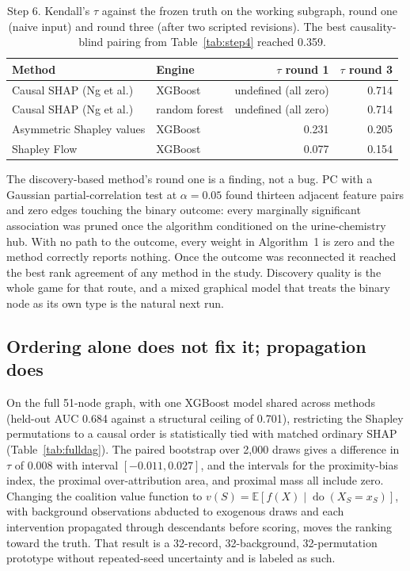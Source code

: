 \documentclass[11pt]{article}
\newcommand{\dox}{\operatorname{do}}
\begin{document}
\begin{table}[htbp]
\centering
\caption{Step 6. Kendall's $\tau$ against the frozen truth on the working
subgraph, round one (naive input) and round three (after two scripted
revisions). The best causality-blind pairing from Table~\ref{tab:step4}
reached 0.359.}
\label{tab:step6}
\begin{tabular}{llrr}
\toprule
Method & Engine & $\tau$ round 1 & $\tau$ round 3\\
\midrule
Causal SHAP (Ng et al.) & XGBoost & undefined (all zero) & 0.714\\
Causal SHAP (Ng et al.) & random forest & undefined (all zero) & 0.714\\
Asymmetric Shapley values & XGBoost & 0.231 & 0.205\\
Shapley Flow & XGBoost & 0.077 & 0.154\\
\bottomrule
\end{tabular}
\end{table}

The discovery-based method's round one is a finding, not a bug. PC with a
Gaussian partial-correlation test at $\alpha=0.05$ found thirteen adjacent
feature pairs and zero edges touching the binary outcome: every marginally
significant association was pruned once the algorithm conditioned on the
urine-chemistry hub. With no path to the outcome, every weight in
Algorithm~1 is zero and the method correctly reports nothing. Once the
outcome was reconnected it reached the best rank agreement of any method
in the study. Discovery quality is the whole game for that route, and a
mixed graphical model that treats the binary node as its own type
\citep{Sedgewick2016,Sedgewick2019} is the natural next run.

\subsection{Ordering alone does not fix it; propagation does}

On the full 51-node graph, with one XGBoost model shared across methods
(held-out AUC 0.684 against a structural ceiling of 0.701), restricting the
Shapley permutations to a causal order is statistically tied with matched
ordinary SHAP (Table~\ref{tab:fulldag}). The paired bootstrap over 2{,}000
draws gives a difference in $\tau$ of 0.008 with interval $[-0.011, 0.027]$,
and the intervals for the proximity-bias index, the proximal
over-attribution area, and proximal mass all include zero. Changing the
coalition value function to $v(S)=\mathbb{E}[f(X)\mid\dox(X_S=x_S)]$, with
background observations abducted to exogenous draws and each intervention
propagated through descendants before scoring, moves the ranking toward the
truth. That result is a 32-record, 32-background, 32-permutation prototype
without repeated-seed uncertainty and is labeled as such.
\end{document}
